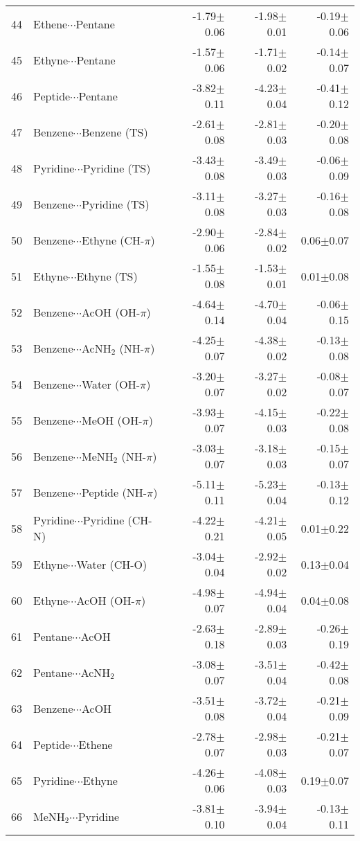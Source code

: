 \begin{longtable}{llrrr}
44 & Ethene$\cdots$Pentane & -1.79$\pm$0.06 & -1.98$\pm$0.01 & -0.19$\pm$0.06  \\
45 & Ethyne$\cdots$Pentane & -1.57$\pm$0.06 & -1.71$\pm$0.02 & -0.14$\pm$0.07  \\
46 & Peptide$\cdots$Pentane & -3.82$\pm$0.11 & -4.23$\pm$0.04 & -0.41$\pm$0.12  \\
47 & Benzene$\cdots$Benzene (TS) & -2.61$\pm$0.08 & -2.81$\pm$0.03 & -0.20$\pm$0.08  \\
48 & Pyridine$\cdots$Pyridine (TS) & -3.43$\pm$0.08 & -3.49$\pm$0.03 & -0.06$\pm$0.09  \\
49 & Benzene$\cdots$Pyridine (TS) & -3.11$\pm$0.08 & -3.27$\pm$0.03 & -0.16$\pm$0.08  \\
50 & Benzene$\cdots$Ethyne (CH-$\pi$) & -2.90$\pm$0.06 & -2.84$\pm$0.02 & 0.06$\pm$0.07  \\
51 & Ethyne$\cdots$Ethyne (TS) & -1.55$\pm$0.08 & -1.53$\pm$0.01 & 0.01$\pm$0.08  \\
52 & Benzene$\cdots$AcOH (OH-$\pi$) & -4.64$\pm$0.14 & -4.70$\pm$0.04 & -0.06$\pm$0.15  \\
53 & Benzene$\cdots$AcNH$_2$ (NH-$\pi$) & -4.25$\pm$0.07 & -4.38$\pm$0.02 & -0.13$\pm$0.08  \\
54 & Benzene$\cdots$Water (OH-$\pi$) & -3.20$\pm$0.07 & -3.27$\pm$0.02 & -0.08$\pm$0.07  \\
55 & Benzene$\cdots$MeOH (OH-$\pi$) & -3.93$\pm$0.07 & -4.15$\pm$0.03 & -0.22$\pm$0.08  \\
56 & Benzene$\cdots$MeNH$_2$ (NH-$\pi$) & -3.03$\pm$0.07 & -3.18$\pm$0.03 & -0.15$\pm$0.07  \\
57 & Benzene$\cdots$Peptide (NH-$\pi$) & -5.11$\pm$0.11 & -5.23$\pm$0.04 & -0.13$\pm$0.12  \\
58 & Pyridine$\cdots$Pyridine (CH-N) & -4.22$\pm$0.21 & -4.21$\pm$0.05 & 0.01$\pm$0.22  \\
59 & Ethyne$\cdots$Water (CH-O) & -3.04$\pm$0.04 & -2.92$\pm$0.02 & 0.13$\pm$0.04  \\
60 & Ethyne$\cdots$AcOH (OH-$\pi$) & -4.98$\pm$0.07 & -4.94$\pm$0.04 & 0.04$\pm$0.08  \\
61 & Pentane$\cdots$AcOH & -2.63$\pm$0.18 & -2.89$\pm$0.03 & -0.26$\pm$0.19  \\
62 & Pentane$\cdots$AcNH$_2$ & -3.08$\pm$0.07 & -3.51$\pm$0.04 & -0.42$\pm$0.08  \\
63 & Benzene$\cdots$AcOH & -3.51$\pm$0.08 & -3.72$\pm$0.04 & -0.21$\pm$0.09  \\
64 & Peptide$\cdots$Ethene & -2.78$\pm$0.07 & -2.98$\pm$0.03 & -0.21$\pm$0.07  \\
65 & Pyridine$\cdots$Ethyne & -4.26$\pm$0.06 & -4.08$\pm$0.03 & 0.19$\pm$0.07  \\
66 & MeNH$_2$$\cdots$Pyridine & -3.81$\pm$0.10 & -3.94$\pm$0.04 & -0.13$\pm$0.11  \\
\end{longtable}\normalsize